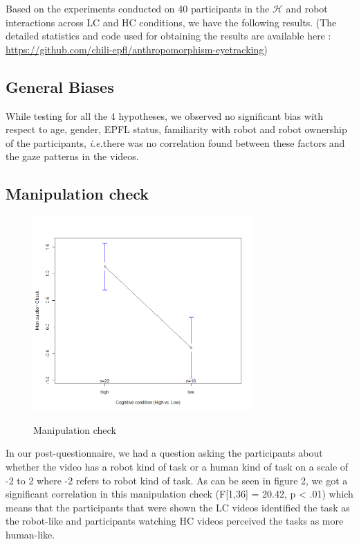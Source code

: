 \documentclass[a4,twocolumn,10pt]{article}
\newcommand{\ie}{{\textit{i.e.\xspace}}}
\begin{document}
Based on the experiments conducted on 40 participants in the $\mathcal{H}$ and
robot interactions across LC and HC conditions, we have the following
results. (The detailed statistics and code used for obtaining the results are
available here : \url{https://github.com/chili-epfl/anthropomorphism-eyetracking})

\subsection{General Biases}

While testing for all the 4 hypotheses, we observed no significant bias with
respect to age, gender, EPFL status, familiarity with robot and robot ownership
of the participants, \ie there was no correlation found between these factors
and the gaze patterns in the videos.

\subsection{Manipulation check}

\begin{figure}
    {\includegraphics[width=3.3in]{ManipulationCheck}}
    \caption{Manipulation check}
    \label{fig:ManipulationCheck}
\end{figure}


In our post-questionnaire, we had a question asking the participants about
whether the video has a robot kind of task or a human kind of task on a scale of
-2 to 2 where -2 refers to robot kind of task. As can be seen in figure 2, we
got a significant correlation in this manipulation check (F[1,36] = 20.42, p <
.01) which means that the participants that were shown the LC videos identified
the task as the robot-like and participants watching HC videos perceived the
tasks as more human-like. 
\end{document}
